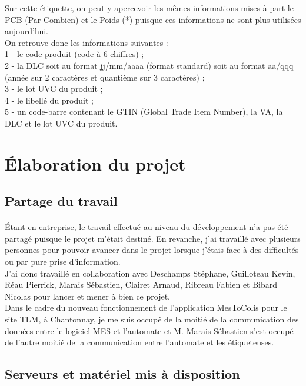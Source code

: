 \documentclass[a4paper,12pt]{extarticle}
\begin{document}
Sur cette étiquette, on peut y apercevoir les mêmes informations mises à part le PCB (Par Combien) et le Poids (*) puisque ces informations ne sont plus utilisées aujourd’hui.\\
On retrouve donc les informations suivantes : \\
1 - le code produit (code à 6 chiffres) ;\\
2 - la DLC soit au format jj/mm/aaaa (format standard) soit au format aa/qqq (année sur 2 caractères et quantième sur 3 caractères) ;\\
3 - le lot UVC du produit ;\\
4 - le libellé du produit ;\\
5 - un code-barre contenant le GTIN (Global Trade Item Number), la VA, la DLC et le lot UVC du produit.\\

	\clearpage

	\section{Élaboration du projet}
	
	\subsection{Partage du travail}
		\paragraph{}

	Étant en entreprise, le travail effectué au niveau du développement n’a pas été partagé puisque le projet m’était destiné. En revanche, j’ai travaillé avec plusieurs personnes pour pouvoir avancer dans le projet lorsque j’étais face à des difficultés ou par pure prise d’information.\\
J’ai donc travaillé en collaboration avec Deschamps Stéphane, Guilloteau Kevin, Réau Pierrick, Marais Sébastien, Clairet Arnaud, Ribreau Fabien et Bibard Nicolas pour lancer et mener à bien ce projet.\\
Dans le cadre du nouveau fonctionnement de l’application MesToColis pour le site TLM, à Chantonnay, je me suis occupé de la moitié de la communication des données entre le logiciel MES et l’automate et M. Marais Sébastien s’est occupé de l’autre moitié de la communication entre l’automate et les étiqueteuses.

	\subsection{Serveurs et matériel mis à disposition}
\end{document}

